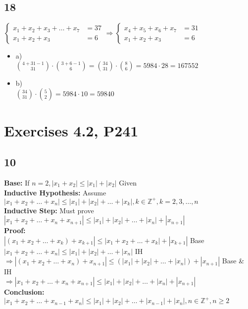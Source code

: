 \documentclass[a4paper]{article}
\begin{document}
\subsection{18}
    $
    \begin{cases}
    x_1+x_2+x_3+\dots+x_7&=37\\
    x_1+x_2+x_3&=6
    \end{cases}
    \Rightarrow
    \begin{cases}
    x_4+x_5+x_6+x_7&=31\\
    x_1+x_2+x_3&=6
    \end{cases}
    $
    \begin{itemize}
      \item a)\\
      $ \binom{4+31-1}{31}\cdot\binom{3+6-1}{6}=\binom{34}{31}\cdot\binom{8}{6}=5984\cdot 28=167552$
      \item b)\\
      $\binom{34}{31}\cdot\binom{5}{2}=5984\cdot 10=59840$
    \end{itemize}
    
\section{Exercises 4.2, P241}
\subsection{10}
\textbf{Base:} If $n=2, |x_1+x_2|\leq|x_1|+|x_2|$ \hfill Given\\
\textbf{Inductive Hypothesis:} Assume $|x_1+x_2+\dots+x_n|\leq|x_1|+|x_2|+\dots+|x_k|,k\in\mathbb{Z}^+,k=2,3,\dots,n$\\
\textbf{Inductive Step:} Must prove $|x_1+x_2+\dots+x_n+x_{n+1}|\leq|x_1|+|x_2|+\dots+|x_n|+|x_{n+1}|$\\
\textbf{Proof:}\\
$|(x_1+x_2+\dots+x_k)+x_{k+1}|\leq|x_1+x_2+\dots+x_k|+|x_{k+1}| $ \hfill Base\\
$|x_1+x_2+\dots+x_n|\leq|x_1|+|x_2|+\dots+|x_n|$ \hfill IH\\
$\Rightarrow |(x_1+x_2+\dots+x_n)+x_{n+1}|\leq(|x_1|+|x_2|+\dots+|x_n|)+|x_{n+1}| $ \hfill Base \& IH\\
$\Rightarrow |x_1+x_2+\dots+x_n+x_{n+1}|\leq|x_1|+|x_2|+\dots+|x_n|+|x_{n+1}| $ \hfill \\
\textbf{Conclusion: }$| x_1+x_2+\dots+x_{n-1}+x_n|\leq|x_1|+|x_2|+\dots+|x_{n-1}|+|x_n|,n\in\mathbb{Z}^+,n\ge2 $
\end{document}
